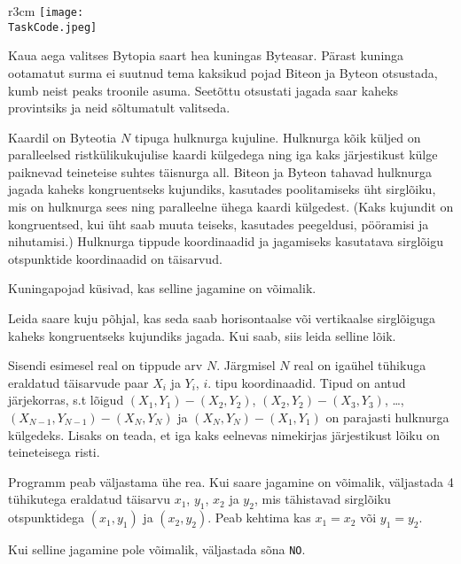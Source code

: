 \documentclass{boi2014-et}
\renewcommand{\TaskCode}{demarcation}
\newcommand{\constant}[1]{{\tt #1}}
\begin{document}
    \begin{wrapfigure}{r}{3cm}
        \vspace{-24pt}
        \texttt{[image: \\TaskCode.jpeg]}
    \end{wrapfigure}

    Kaua aega valitses Bytopia saart hea kuningas Byteasar.
    Pärast kuninga ootamatut surma ei suutnud tema kaksikud pojad
    Biteon ja Byteon otsustada, kumb neist peaks troonile asuma.
    Seetõttu otsustati jagada saar kaheks provintsiks ja neid
    sõltumatult valitseda.

    Kaardil on Byteotia $N$ tipuga hulknurga kujuline.
    Hulknurga kõik küljed on paralleelsed ristkülikukujulise kaardi külgedega ning
    iga kaks järjestikust külge paiknevad teineteise suhtes täisnurga all.
    Biteon ja Byteon tahavad hulknurga jagada kaheks kongruentseks kujundiks,
    kasutades poolitamiseks üht sirglõiku,
    mis on hulknurga sees ning paralleelne ühega kaardi külgedest.
    (Kaks kujundit on kongruentsed, kui üht saab muuta teiseks,
    kasutades peegeldusi, pööramisi ja nihutamisi.)
    Hulknurga tippude koordinaadid ja jagamiseks
    kasutatava sirglõigu otspunktide koordinaadid on täisarvud.

    Kuningapojad küsivad, kas selline jagamine on võimalik.

    \Task

    Leida saare kuju põhjal, kas seda saab horisontaalse või vertikaalse sirglõiguga
    kaheks kongruentseks kujundiks jagada.
    Kui saab, siis leida selline lõik.

    \Input

    Sisendi esimesel real on tippude arv $N$.
    Järgmisel $N$ real on igaühel tühikuga eraldatud täisarvude paar
    $X_i$ ja $Y_i$, $i$. tipu koordinaadid.
    Tipud on antud järjekorras, s.t lõigud $(X_1,Y_1) - (X_2,Y_2)$,
    $(X_2,Y_2) - (X_3,Y_3)$, \ldots, $(X_{N-1},Y_{N-1}) - (X_N,Y_N)$ ja
    $(X_N,Y_N) - (X_1,Y_1)$ on parajasti hulknurga külgedeks.
    Lisaks on teada, et iga kaks eelnevas nimekirjas järjestikust
    lõiku on teineteisega risti.

    \Output

    Programm peab väljastama ühe rea.
    Kui saare jagamine on võimalik, väljastada 4 tühikutega eraldatud täisarvu
    $x_1$, $y_1$, $x_2$ ja $y_2$, mis tähistavad sirglõiku otspunktidega
    $(x_1, y_1)$ ja $(x_2, y_2)$.
    Peab kehtima kas $x_1 = x_2$ või $y_1 = y_2$.

    Kui selline jagamine pole võimalik, väljastada sõna \constant{NO}.
\end{document}
